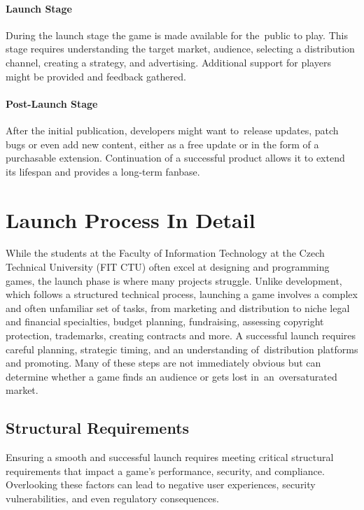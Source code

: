 \paragraph{Launch Stage}
During the launch stage the game is made available for the~public to play. This stage requires understanding the target market, audience, selecting a distribution channel, creating a strategy, and advertising. Additional support for players might be provided and feedback gathered.
\cite{bramble_7-stages, rocket_6-stages, esler_viable-games}

\paragraph{Post-Launch Stage}
After the initial publication, developers might want to~release updates, patch bugs or even add new content, either as a free update or in the form of a purchasable extension. Continuation of a successful product allows it to extend its lifespan and provides a long-term fanbase.
\cite{bramble_7-stages, rocket_6-stages}

\section{Launch Process In Detail}
While the students at the Faculty of Information Technology at the Czech Technical University (FIT CTU) often excel at designing and programming games, the launch phase is where many projects struggle. Unlike development, which follows a structured technical process, launching a game involves a complex and often unfamiliar set of tasks, from marketing and distribution to niche legal and financial specialties, budget planning, fundraising, assessing copyright protection, trademarks, creating contracts and more. A successful launch requires careful planning, strategic timing, and an understanding of~distribution platforms and promoting. Many of these steps are not immediately obvious but can determine whether a game finds an audience or gets lost in~an~oversaturated market.

\subsection{Structural Requirements}
Ensuring a smooth and successful launch requires meeting critical structural requirements that impact a game’s performance, security, and compliance. Overlooking these factors can lead to negative user experiences, security vulnerabilities, and even regulatory consequences.

